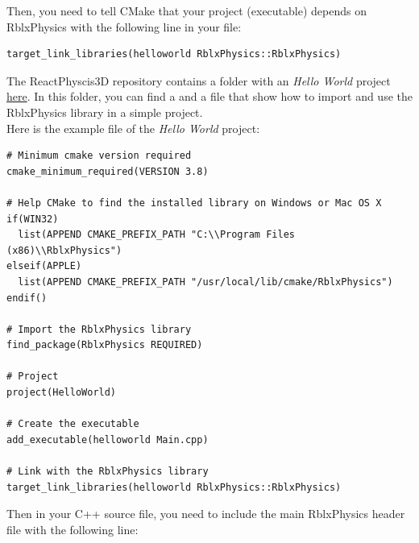 \documentclass[a4paper,12pt]{article}
\begin{document}
    Then, you need to tell CMake that your project (executable) depends on RblxPhysics with the following line in your  file: 

    \vspace{0.6cm}

    \begin{lstlisting}
target_link_libraries(helloworld RblxPhysics::RblxPhysics)
    \end{lstlisting}

    \vspace{0.6cm}

   The ReactPhyscis3D repository contains a folder with an \emph{Hello World} project \href{https://github.com/DanielChappuis/rblxphysics/tree/master/helloworld}{here}. In this folder, you can find a  and a  file that show how to import and use the RblxPhysics library in a simple project. \\

   Here is the example  file of the \emph{Hello World} project:
   
    \vspace{0.6cm}

    \begin{lstlisting}
# Minimum cmake version required
cmake_minimum_required(VERSION 3.8)

# Help CMake to find the installed library on Windows or Mac OS X
if(WIN32)
  list(APPEND CMAKE_PREFIX_PATH "C:\\Program Files (x86)\\RblxPhysics")
elseif(APPLE)
  list(APPEND CMAKE_PREFIX_PATH "/usr/local/lib/cmake/RblxPhysics")
endif()

# Import the RblxPhysics library 
find_package(RblxPhysics REQUIRED)

# Project
project(HelloWorld)

# Create the executable
add_executable(helloworld Main.cpp)

# Link with the RblxPhysics library
target_link_libraries(helloworld RblxPhysics::RblxPhysics)
    \end{lstlisting}

    \lstset{style=customcpp}

    \vspace{0.6cm}
   
    Then in your C++ source file, you need to include the main RblxPhysics header file with the following line: \\
\end{document}
